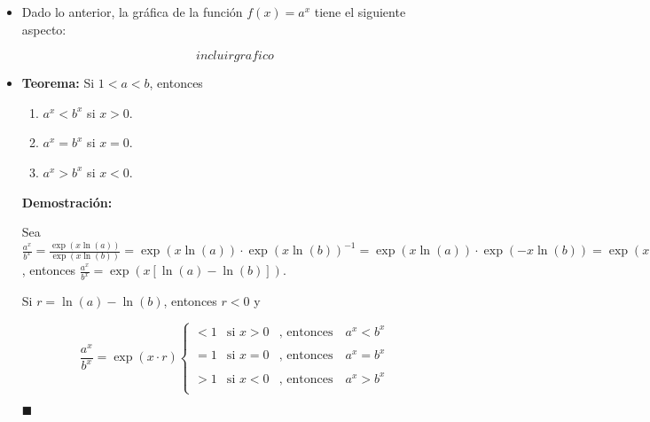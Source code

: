 \documentclass[pts12]{article}
\numberwithin{equation}{section}
\newcommand{\Col}{\color{ProcessBlue}}
\newcommand{\limit}[2]{\lim_{#1\to #2}}
\newcommand{\limf}[1]{\lim_{#1\to\infty}}
\begin{document}
\begin{itemize}
\begin{enumerate}
\begin{enumerate}
\item[\textbf{Caso 2.}]  $a=1$
\begin{enumerate}
\item $\limf{x}a^x=\limf{x}\exp(x\ln(a))=\limf{x}\exp(x\cdot 0)=1$.
\item $\limit{x}{-\infty}a^x=\limit{x}{-\infty}\exp(x\ln(a))=\limit{x}{-\infty}\exp(x\cdot 0)=1$.
\end{enumerate} 

\item[\textbf{Caso 3.}]  $1<a$
\begin{enumerate}
\item $\limf{x}a^x=\limf{x}\exp(x\ln(a))=\infty$.
\item $\limit{x}{-\infty}a^x=\limit{x}{-\infty}\exp(x\ln(a))=0$.
\end{enumerate} 

\end{enumerate}

\end{enumerate}

\item[\Col •] Dado lo anterior, la gráfica de la función $f(x)=a^x$ tiene el siguiente aspecto:

$$ incluir grafico $$

\item[\Col •] \textbf{Teorema:} Si $1<a<b$, entonces 

\begin{enumerate}
\item[a)] $a^x<b^x$ si $x>0$.
\item[b)] $a^x=b^x$ si $x=0$.
\item[c)] $a^x>b^x$ si $x<0$.
\end{enumerate}

\textbf{Demostración:} 

Sea $\frac{a^x}{b^x}=\frac{\exp(x\ln(a))}{\exp(x\ln(b))}=\exp(x\ln(a))\cdot\exp(x\ln(b))^{-1}=\exp(x\ln(a))\cdot\exp(-x\ln(b))=\exp(x\ln(a)-x\ln(b))=\exp(x(\ln(a)-\ln(b)))$, entonces $\frac{a^x}{b^x}=\exp(x[\ln(a)-\ln(b)])$. 

Si $r=\ln(a)-\ln(b)$, entonces $r<0$ y 

$$\frac{a^x}{b^x}=\exp(x\cdot r)
\left\{
    \begin{array}{lll}
        <1  & \mbox{si } x>0 & \mbox{, entonces} \quad a^x<b^x \\
        \\ =1 & \mbox{si } x=0 & \mbox{, entonces} \quad a^x=b^x \\
        \\ >1 & \mbox{si } x<0 & \mbox{, entonces} \quad a^x>b^x \\
    \end{array}
\right.$$

\begin{flushright}
$\blacksquare$
\end{flushright} 

\end{itemize}
\end{document}

